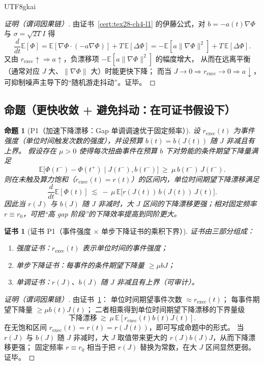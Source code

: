 \documentclass[12pt]{article}
\newtheorem{proposition}{命题}[section]
\newtheorem{Certificate}{证书}[section]
\begin{document}
\begin{CJK*}{UTF8}{gkai}
\begin{proof}[证明（谓词因果链）]
由证书~\ref{cert:tex28-ch4-l1} 的伊藤公式，对 $b=-a(t)\nabla\Phi$ 与 $\sigma=\sqrt{2T}I$ 得
\[
  \frac{d}{dt}\mathbb{E}[\Phi]
  = \mathbb{E}[\nabla\Phi\cdot (-a\nabla\Phi)] + T\,\mathbb{E}[\Delta\Phi]
  = -\mathbb{E}[a\|\nabla\Phi\|^2] + T\,\mathbb{E}[\Delta\Phi].
\]
又由 $r_{\mathrm{exec}}\uparrow \Rightarrow a\uparrow$，负漂移项 $-\mathbb{E}[a\|\nabla\Phi\|^2]$ 的幅度增大，
从而在远离平衡（通常对应 $J$ 大、$\|\nabla\Phi\|$ 大）时能更快下降；
而当 $J\to 0\Rightarrow r_{\mathrm{exec}}\to 0\Rightarrow a\downarrow$，
可抑制噪声主导下的“随机游走抖动”。证毕。
\end{proof}

\subsection{命题（更快收敛 + 避免抖动：在可证书假设下）}
\label{subsec:tex28-ch4-props}

\begin{proposition}[P1（加速下降漂移：Gap 单调调速优于固定频率）]
\label{prop:tex28-ch4-p1}
设 $r_{\mathrm{exec}}(t)$ 为事件强度（单位时间触发次数的强度），并设预算 $b(t)=b(J(t))$ 随 $J$ 非减且有上界。
假设存在 $\mu>0$ 使得每次扭曲事件在预算 $b$ 下对势能的\emph{条件期望下降量}满足
\[
  \mathbb{E}\bigl[\Phi(t^-)-\Phi(t^+)\mid J(t^-),b(t^-)\bigr]\ \ge\ \mu\, b(t^-)\,J(t^-).
\]
则在未触及算力饱和（$r_{\mathrm{exec}}(t)=r(t)$）的区间内，单位时间期望下降漂移满足
\[
  \frac{d}{dt}\mathbb{E}[\Phi(t)]\ \lesssim\ -\,\mu\,\mathbb{E}\bigl[r(J(t))\,b(J(t))\,J(t)\bigr].
\]
因此当 $r(J)$ 与 $b(J)$ 随 $J$ 非减时，大 $J$ 区间的下降漂移更强；相对固定频率 $r\equiv r_0$，可把“高 gap 阶段”的下降效率提高到同阶更大。
\end{proposition}

\begin{Certificate}[证书 P1（事件强度 × 单步下降证书的乘积下界）]
\label{cert:tex28-ch4-p1}
证书由三部分组成：
\begin{enumerate}
  \item 强度证书：$r_{\mathrm{exec}}(t)$ 表示单位时间的事件强度；
  \item 单步下降证书：每事件的条件期望下降量 $\ge \mu bJ$；
  \item 单调证书：$r(J)$、$b(J)$ 随 $J$ 非减且有上界（可审计）。
\end{enumerate}
\end{Certificate}

\begin{proof}[证明（谓词因果链）]
由证书~\ref{cert:tex28-ch4-p1}：
单位时间期望事件次数 $\approx r_{\mathrm{exec}}(t)$；
每事件期望下降量 $\ge \mu b(t)J(t)$；
二者相乘得到单位时间期望下降漂移的下界量级
\[
  \text{下降漂移}\ \gtrsim\ \mu\,\mathbb{E}[r_{\mathrm{exec}}(t)b(t)J(t)].
\]
在无饱和区间 $r_{\mathrm{exec}}(t)=r(t)=r(J(t))$，即可写成命题中的形式。
当 $r(J)$ 与 $b(J)$ 随 $J$ 非减时，大 $J$ 取值带来更大的 $r(J)b(J)J$，从而下降漂移更强；
固定频率 $r\equiv r_0$ 相当于把 $r(J)$ 替换为常数，在大 $J$ 区间显然更弱。证毕。
\end{proof}


\end{CJK*}
\end{document}
